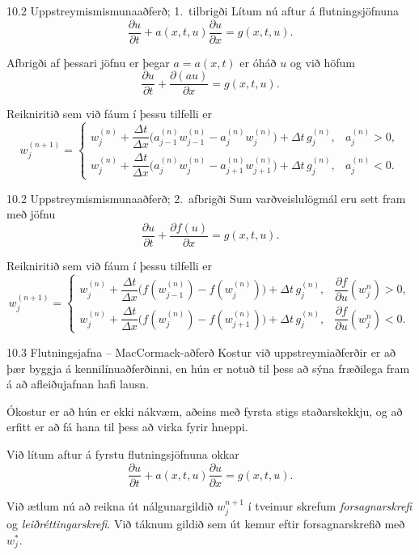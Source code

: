 \begin{frame}{10.2 Uppstreymismismunaaðferð; 1.~tilbrigði} 
Lítum nú aftur á flutningsjöfnuna
$$
\dfrac{\partial u}{\partial t}
+a(x,t,u)\dfrac{\partial u}{\partial x}=g(x,t,u).
$$

Afbrigði af þessari jöfnu er þegar $a=a(x,t)$ 
er óháð $u$ og við höfum 
$$
\dfrac{\partial u}{\partial t}
+\dfrac{\partial (au)}{\partial x}=g(x,t,u).
$$

Reikniritið sem við fáum í þessu tilfelli er
$$
w_j^{(n+1)}=
\begin{cases} 
w_j^{(n)}+\dfrac{\Delta t}{\Delta x} 
\big(a_{j-1}^{(n)}w_{j-1}^{(n)}-a_j^{(n)}w_j^{(n)}\big)
+\Delta t\, g_j^{(n)},&a_j^{(n)}>0,\\
w_j^{(n)}+\dfrac{\Delta t}{\Delta x} 
\big(a_{j}^{(n)}w_{j}^{(n)}-a_{j+1}^{(n)}w_{j+1}^{(n)}\big)
+\Delta t\, g_j^{(n)}, &a_j^{(n)}<0.
\end{cases}
$$
\end{frame}


\begin{frame}{10.2 Uppstreymismismunaaðferð; 2.~afbrigði } 
Sum varðveislulögmál eru sett fram með jöfnu
$$
\dfrac{\partial u}{\partial t}
+\dfrac{\partial f(u)}{\partial x}=g(x,t,u).
$$

Reikniritið sem við fáum í þessu tilfelli er
$$
w_j^{(n+1)}=
\begin{cases} 
w_j^{(n)}+\dfrac{\Delta t}{\Delta x} 
\big(f(w_{j-1}^{(n)})-f(w_j^{(n)})\big)
+\Delta t\, g_j^{(n)},& \dfrac{\partial f}{\partial u}(w_j^{n})>0,\\
w_j^{(n)}+\dfrac{\Delta t}{\Delta x} 
\big(f(w_{j}^{(n)})-f(w_{j+1}^{(n)})\big)
+\Delta t\, g_j^{(n)}, &\dfrac{\partial f}{\partial u}(w_j^{n})<0.
\end{cases}
$$
\end{frame}


\begin{frame}{10.3 Flutningsjafna -- MacCormack-aðferð} 
Kostur við uppstreymiaðferðir er að þær byggja á kennilínuaðferðinni,
en hún er notuð  til þess að sýna fræðilega fram á að afleiðujafnan
hafi lausn.

\smallskip
Ókostur er að hún er ekki nákvæm, aðeins með fyrsta stigs
staðarskekkju, og að erfitt er að fá hana til þess að virka fyrir
hneppi.

Við lítum aftur á fyrstu flutningsjöfnuna okkar
$$
\dfrac{\partial u}{\partial t}
+a(x,t,u)\dfrac{\partial u}{\partial x}=g(x,t,u).
$$

Við ætlum nú að reikna út nálgunargildið $w_j^{n+1}$ í tveimur skrefum
{\it forsagnarskrefi} og {\it leiðréttingarskrefi}.  Við táknum gildið
sem út kemur eftir forsagnarskrefið með $w_j^*$.
\end{frame}


